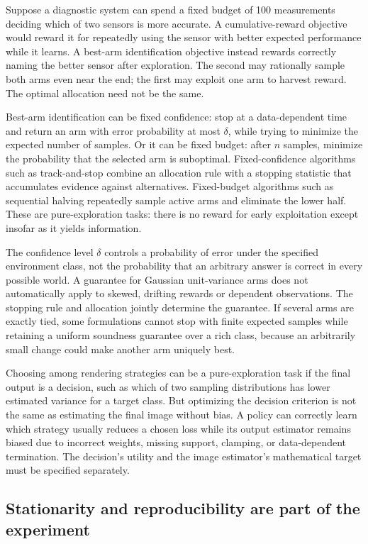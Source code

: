Suppose a diagnostic system can spend a fixed budget of 100 measurements deciding which of two sensors is more accurate. A cumulative-reward objective would reward it for repeatedly using the sensor with better expected performance while it learns. A best-arm identification objective instead rewards correctly naming the better sensor after exploration. The second may rationally sample both arms even near the end; the first may exploit one arm to harvest reward. The optimal allocation need not be the same.

Best-arm identification can be fixed confidence: stop at a data-dependent time and return an arm with error probability at most \(\delta\), while trying to minimize the expected number of samples. Or it can be fixed budget: after \(n\) samples, minimize the probability that the selected arm is suboptimal. Fixed-confidence algorithms such as track-and-stop combine an allocation rule with a stopping statistic that accumulates evidence against alternatives. Fixed-budget algorithms such as sequential halving repeatedly sample active arms and eliminate the lower half. These are pure-exploration tasks: there is no reward for early exploitation except insofar as it yields information.

The confidence level \(\delta\) controls a probability of error under the specified environment class, not the probability that an arbitrary answer is correct in every possible world. A guarantee for Gaussian unit-variance arms does not automatically apply to skewed, drifting rewards or dependent observations. The stopping rule and allocation jointly determine the guarantee. If several arms are exactly tied, some formulations cannot stop with finite expected samples while retaining a uniform soundness guarantee over a rich class, because an arbitrarily small change could make another arm uniquely best.

Choosing among rendering strategies can be a pure-exploration task if the final output is a decision, such as which of two sampling distributions has lower estimated variance for a target class. But optimizing the decision criterion is not the same as estimating the final image without bias. A policy can correctly learn which strategy usually reduces a chosen loss while its output estimator remains biased due to incorrect weights, missing support, clamping, or data-dependent termination. The decision's utility and the image estimator's mathematical target must be specified separately.

\subsection{Stationarity and reproducibility are part of the experiment}\label{03-visual-computing-i-ch012-stationarity-and-reproducibility-are-part-of-the-experiment}

